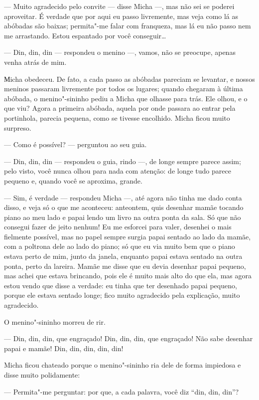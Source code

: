 --- Muito agradecido pelo convite --- disse Micha ---, mas não sei se
poderei aproveitar. É verdade que por aqui eu passo livremente, mas veja como lá as abóbadas são baixas; permita"-me falar com
franqueza, mas lá eu não passo nem me arrastando. Estou espantado por
você conseguir\ldots{}

--- Din, din, din --- respondeu o menino ---, vamos, não se preocupe,
apenas venha atrás de mim.

Мicha obedeceu. De fato, a cada passo as abóbadas pareciam se levantar,
e nossos meninos passaram livremente por todos os lugares; quando
chegaram à última abóbada, o menino"-sininho pediu a Micha que olhasse
para trás. Ele olhou, e o que viu? Agora a primeira abóbada, aquela por
onde passara ao entrar pela portinhola, parecia pequena, como se tivesse
encolhido. Micha ficou muito surpreso.

--- Como é possível? --- perguntou ao seu guia.

--- Din, din, din --- respondeu o guia, rindo ---, de longe sempre
parece assim; pelo visto, você nunca olhou para nada com atenção: de
longe tudo parece pequeno e, quando você se aproxima, grande.

--- Sim, é verdade --- respondeu Micha ---, até agora não tinha me dado
conta disso, e veja só o que me aconteceu: anteontem, quis desenhar
mamãe tocando piano ao meu lado e papai lendo um livro na outra ponta da
sala. Só que não consegui fazer de jeito nenhum! Eu me esforcei para
valer, desenhei o mais fielmente possível, mas no papel sempre surgia
papai sentado ao lado da mamãe, com a poltrona dele ao lado do piano; só
que eu via muito bem que o piano estava perto de mim, junto da janela, enquanto papai estava sentado na outra ponta, perto da lareira. Mamãe me disse
que eu devia desenhar papai pequeno, mas achei que estava brincando,
pois ele é muito mais alto do que ela, mas agora estou vendo que disse a
verdade: eu tinha que ter desenhado papai pequeno, porque ele estava sentado
longe; fico muito agradecido pela explicação, muito agradecido.

O menino"-sininho morreu de rir.

--- Din, din, din, que engraçado! Din, din, din, que engraçado! Não sabe
desenhar papai e mamãe! Din, din, din, din, din!

Micha ficou chateado porque o menino"-sininho ria dele de forma impiedosa e disse muito polidamente:

--- Permita"-me perguntar: por que, a cada palavra, você diz ``din, din,
din''?

